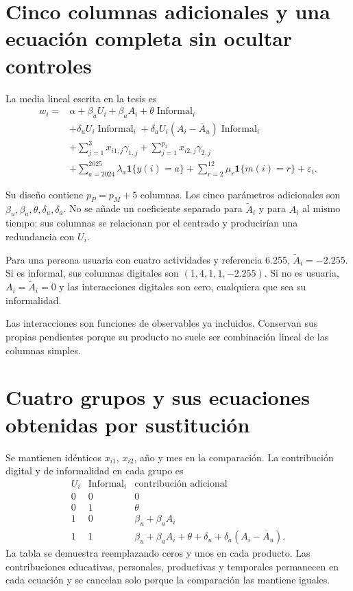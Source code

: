 \documentclass[11pt,a4paper]{article}
\begin{document}
\section{Cinco columnas adicionales y una ecuación completa sin ocultar controles}
La media lineal escrita en la tesis es
\[
\begin{aligned}w_i={}&\alpha+\beta_uU_i+\beta_aA_i+\theta\operatorname{Informal}_i\\&+\delta_uU_i\operatorname{Informal}_i+\delta_aU_i(A_i-\overline A_u)\operatorname{Informal}_i\\&+\sum_{j=1}^3x_{i1,j}\gamma_{1,j}+\sum_{j=1}^{p_2}x_{i2,j}\gamma_{2,j}\\&+\sum_{a=2024}^{2025}\lambda_a\mathbf1\{y(i)=a\}
+\sum_{r=2}^{12}\mu_r\mathbf1\{m(i)=r\}+\varepsilon_i.\end{aligned}
\]

Su diseño contiene $p_P=p_M+5$ columnas. Los cinco parámetros adicionales son $\beta_u,\beta_a,\theta,\delta_u,\delta_a$. No se añade un coeficiente separado para $\widetilde A_i$ y para $A_i$ al mismo tiempo: sus columnas se relacionan por el centrado y producirían una redundancia con $U_i$.

Para una persona usuaria con cuatro actividades y referencia 6.255, $\widetilde A_i=-2.255$. Si es informal, sus columnas digitales son $(1,4,1,1,-2.255)$. Si no es usuaria, $A_i=\widetilde A_i=0$ y las interacciones digitales son cero, cualquiera que sea su informalidad.

Las interacciones son funciones de observables ya incluidos. Conservan sus propias pendientes porque su producto no suele ser combinación lineal de las columnas simples.

\clearpage
\section{Cuatro grupos y sus ecuaciones obtenidas por sustitución}

Se mantienen idénticos $x_{i1}$, $x_{i2}$, año y mes en la comparación. La contribución digital y de informalidad en cada grupo es
\[
\begin{array}{c|c|l}
U_i&\operatorname{Informal}_i&\text{contribución adicional}\\\hline
0&0&0\\
0&1&\theta\\
1&0&\beta_u+\beta_aA_i\\
1&1&\beta_u+\beta_aA_i+\theta+\delta_u+\delta_a(A_i-\overline A_u).
\end{array}
\]
La tabla se demuestra reemplazando ceros y unos en cada producto. Las contribuciones educativas, personales, productivas y temporales permanecen en cada ecuación y se cancelan solo porque la comparación las mantiene iguales.
\end{document}
